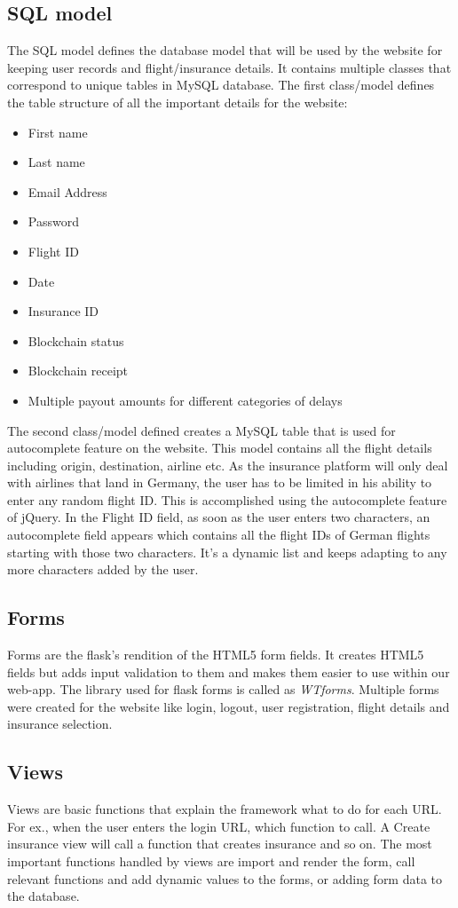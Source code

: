 \subsection{SQL model}
The SQL model defines the database model that will be used by the website for keeping user records and flight/insurance details. It contains multiple classes that correspond to unique tables in MySQL database. The first class/model defines the table structure of all the important details for the website:
\begin{itemize}
    \item First name
    \item Last name
    \item Email Address
    \item Password
    \item Flight ID
    \item Date
    \item Insurance ID
    \item Blockchain status
    \item Blockchain receipt
    \item Multiple payout amounts for different categories of delays
\end{itemize}

The second class/model defined creates a MySQL table that is used for autocomplete feature on the website. This model contains all the flight details including origin, destination, airline etc. As the insurance platform will only deal with airlines that land in Germany, the user has to be limited in his ability to enter any random flight ID. This is accomplished using the autocomplete feature of jQuery. In the Flight ID field, as soon as the user enters two characters, an autocomplete field appears which contains all the flight IDs of German flights starting with those two characters. It's a dynamic list and keeps adapting to any more characters added by the user. 

\subsection{Forms}
Forms are the flask's rendition of the HTML5 form fields. It creates HTML5 fields but adds input validation to them and makes them easier to use within our web-app. The library used for flask forms is called as \textit{WTforms}. Multiple forms were created for the website like login, logout, user registration, flight details and insurance selection. 

\subsection{Views}
Views are basic functions that explain the framework what to do for each URL. For ex., when the user enters the login URL, which function to call. A Create insurance view will call a function that creates insurance and so on. The most important functions handled by views are import and render the form, call relevant functions and add dynamic values to the forms, or adding form data to the database. 

